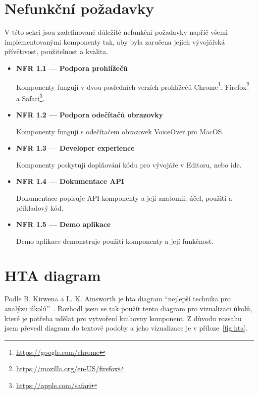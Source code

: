 \section{Nefunkční požadavky}

V této sekci jsou zadefinované důležité nefunkční požadavky napříč všemi implementovanými komponenty tak, aby byla zaručena jejich vývojářská přívětivost, použitelnost a kvalita.

\begin{itemize}
      \item \textbf{NFR 1.1 --- Podpora prohlížečů}\label{nfr11}

            Komponenty fungují v dvou posledních verzích prohlížečů Chrome\footnote{\url{https://google.com/chrome}}, Firefox\footnote{\url{https://mozilla.org/en-US/firefox}} a Safari\footnote{\url{https://apple.com/safari}}.

      \item \textbf{NFR 1.2 --- Podpora odečítačů obrazovky}\label{nfr12}

            Komponenty fungují s odečítačem obrazovek VoiceOver pro MacOS.

      \item \textbf{NFR 1.3 --- Developer experience}\label{nfr13}

            Komponenty poskytují doplňování kódu pro vývojáře v Editoru, nebo \gls{ide}.

      \item \textbf{NFR 1.4 --- Dokumentace API}\label{nfr14}

            Dokumentace popisuje API komponenty a její anatomii, účel, použití a příkladový kód.

      \item \textbf{NFR 1.5 --- Demo aplikace}\label{nfr15}

            Demo aplikace demonstruje použití komponenty a její funkčnost.
\end{itemize}

\section{HTA diagram}

Podle B. Kirwena a L. K. Ainsworth je \gls{hta} diagram ``nejlepší technika pro analýzu úkolů''~\cite{kirwan1992}.
Rozhodl jsem se tak použít tento diagram pro vizualizaci úkolů, které je potřeba udělat pro vytvoření knihovny komponent.
Z důvodu rozsahu jsem převedl diagram do textové podoby a jeho vizualizace je v příloze~\ref{fig:hta}.

